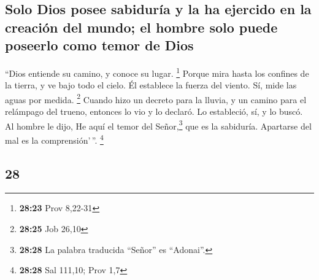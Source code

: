 \begin{paracol}{2}
\hypertarget{solo-dios-posee-sabiduruxeda-y-la-ha-ejercido-en-la-creaciuxf3n-del-mundo-el-hombre-solo-puede-poseerlo-como-temor-de-dios}{%
\subsection{Solo Dios posee sabiduría y la ha ejercido en la creación
del mundo; el hombre solo puede poseerlo como temor de
Dios}\label{solo-dios-posee-sabiduruxeda-y-la-ha-ejercido-en-la-creaciuxf3n-del-mundo-el-hombre-solo-puede-poseerlo-como-temor-de-dios}}

 ``Dios entiende su camino, y conoce su lugar.
\footnote{\textbf{28:23} Prov 8,22-31}  Porque mira hasta
los confines de la tierra, y ve bajo todo el cielo.  Él
establece la fuerza del viento. Sí, mide las aguas por medida.
\footnote{\textbf{28:25} Job 26,10}  Cuando hizo un
decreto para la lluvia, y un camino para el relámpago del trueno,
 entonces lo vio y lo declaró. Lo estableció, sí, y lo
buscó.  Al hombre le dijo, He aquí el temor del
Señor,\footnote{\textbf{28:28} La palabra traducida ``Señor'' es
  ``Adonai''.} que es la sabiduría. Apartarse del mal es la
comprensión'\,''. \footnote{\textbf{28:28} Sal 111,10; Prov 1,7}

\switchcolumn
\begin{otherlanguage}{english}

\hypertarget{section-55}{%
\section{28}\label{section-55}}


\end{otherlanguage}
\end{paracol}
